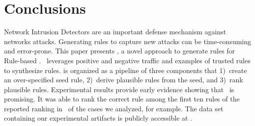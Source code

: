 \documentclass[conference]{IEEEtran}
\begin{document}




\section{Conclusions}

Network Intrusion Detectors are an important defense mechanism against
networks attacks. Generating rules to capture new attacks can be
time-consuming and error-prone. This paper presents \tname{}, a novel
approach to generate rules for Rule-based \nids. \tname\ leverages
positive and negative traffic and examples of trusted rules to
synthesize rules. \tname{} is organized as a pipeline of three
components that 1)~create an over-specified seed rule, 2)~derive
plausible rules from the seed, and 3)~rank plausible
rules. Experimental results provide early evidence showing that
\tname\ is promising. It was able to rank the correct rule among the
first ten rules of the reported ranking in \percTopFiveRanking\ of
the cases we analyzed, for example. The data set containing our
experimental artifacts is publicly accessible at \ourdataset.



\balance
%


\end{document}
